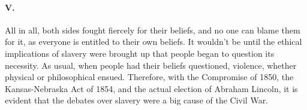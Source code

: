\documentclass[12pt]{article}
\begin{document}
  \paragraph{V.} All in all, both sides fought fiercely for their beliefs, and no one can blame them for it, as everyone is entitled to their own beliefs. It wouldn't be until the ethical implications of slavery were brought up that people began to question its necessity. As usual, when people had their beliefs questioned, violence, whether physical or philosophical ensued. Therefore, with the Compromise of 1850, the Kansas-Nebraska Act of 1854, and the actual election of Abraham Lincoln, it is evident that the debates over slavery were a big cause of the Civil War.
\end{document}
